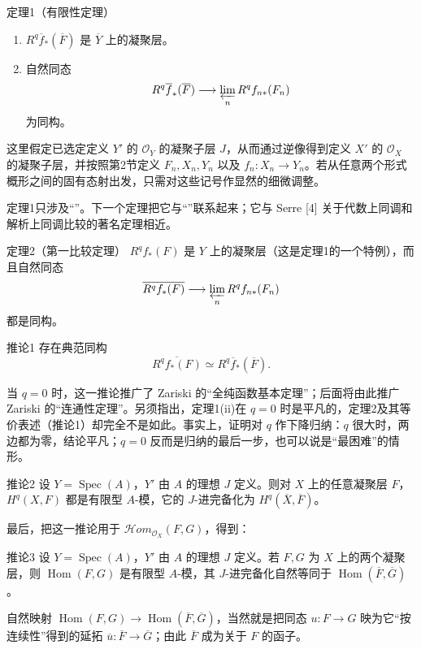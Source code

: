 \begin{statement}{定理1（有限性定理）}
\begin{enumerate}
\item[(i)] $R^q\overline f_*(\overline F)$ 是 $\overline Y$ 上的凝聚层。
\item[(ii)] 自然同态
\[
R^q\overline f_*(\overline F)\longrightarrow\varprojlim_n R^q f_{n*}(F_n)
\]
为同构。
\end{enumerate}
\end{statement}
这里假定已选定定义 $Y'$ 的 $\mathcal O_Y$ 的凝聚子层 $J$，从而通过逆像得到定义 $X'$ 的 $\mathcal O_X$ 的凝聚子层，并按照第2节定义 $F_n,X_n,Y_n$ 以及 $f_n:X_n\to Y_n$。若从任意两个形式概形之间的固有态射出发，只需对这些记号作显然的细微调整。

定理1只涉及“”。下一个定理把它与“”联系起来；它与 Serre [4] 关于代数上同调和解析上同调比较的著名定理相近。

\begin{statement}{定理2（第一比较定理）}
$R^q f_*(F)$ 是 $Y$ 上的凝聚层（这是定理1的一个特例），而且自然同态
\[
\overline{R^q f_*(F)}\longrightarrow\varprojlim_n R^q f_{n*}(F_n)
\]
都是同构。
\end{statement}
\begin{statement}{推论1}
存在典范同构
\[
\overline{R^q f_*(F)}\simeq R^q\overline f_*(\overline F).
\]
\end{statement}
当 $q=0$ 时，这一推论推广了 Zariski 的“全纯函数基本定理”；后面将由此推广 Zariski 的“连通性定理”。另须指出，定理1(ii)在 $q=0$ 时是平凡的，定理2及其等价表述（推论1）却完全不是如此。事实上，证明对 $q$ 作下降归纳：$q$ 很大时，两边都为零，结论平凡；$q=0$ 反而是归纳的最后一步，也可以说是“最困难”的情形。

\begin{statement}{推论2}
设 $Y=\operatorname{Spec}(A)$，$Y'$ 由 $A$ 的理想 $J$ 定义。则对 $X$ 上的任意凝聚层 $F$，$H^q(X,F)$ 都是有限型 $A$-模，它的 $J$-进完备化为 $H^q(\overline X,\overline F)$。
\end{statement}
最后，把这一推论用于 $\mathcal H om_{\mathcal O_X}(F,G)$，得到：
\begin{statement}{推论3}
设 $Y=\operatorname{Spec}(A)$，$Y'$ 由 $A$ 的理想 $J$ 定义。若 $F,G$ 为 $X$ 上的两个凝聚层，则 $\operatorname{Hom}(F,G)$ 是有限型 $A$-模，其 $J$-进完备化自然等同于 $\operatorname{Hom}(\overline F,\overline G)$。
\end{statement}
自然映射 $\operatorname{Hom}(F,G)\to\operatorname{Hom}(\overline F,\overline G)$，当然就是把同态 $u:F\to G$ 映为它“按连续性”得到的延拓 $\overline u:\overline F\to\overline G$；由此 $\overline F$ 成为关于 $F$ 的函子。

